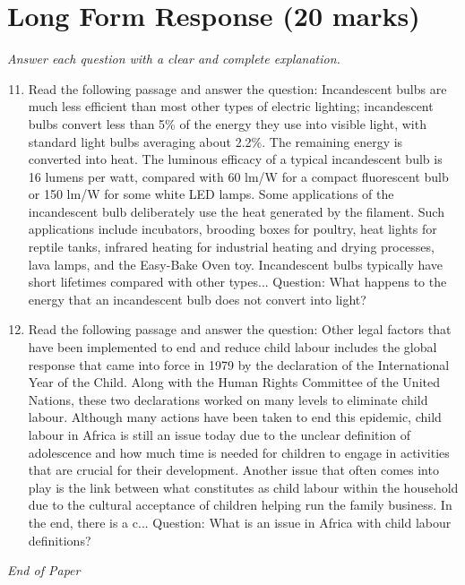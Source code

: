 \documentclass[12pt]{article}
\begin{document}
\section*{Long Form Response (20 marks)}
\textit{Answer each question with a clear and complete explanation.}
\begin{enumerate}[label=\arabic*.]
\setcounter{enumi}{10}
\item Read the following passage and answer the question: Incandescent bulbs are much less efficient than most other types of electric lighting; incandescent bulbs convert less than 5\% of the energy they use into visible light, with standard light bulbs averaging about 2.2\%. The remaining energy is converted into heat. The luminous efficacy of a typical incandescent bulb is 16 lumens per watt, compared with 60 lm/W for a compact fluorescent bulb or 150 lm/W for some white LED lamps. Some applications of the incandescent bulb deliberately use the heat generated by the filament. Such applications include incubators, brooding boxes for poultry, heat lights for reptile tanks, infrared heating for industrial heating and drying processes, lava lamps, and the Easy-Bake Oven toy. Incandescent bulbs typically have short lifetimes compared with other types... Question: What happens to the energy that an incandescent bulb does not convert into light?
\item Read the following passage and answer the question: Other legal factors that have been implemented to end and reduce child labour includes the global response that came into force in 1979 by the declaration of the International Year of the Child. Along with the Human Rights Committee of the United Nations, these two declarations worked on many levels to eliminate child labour. Although many actions have been taken to end this epidemic, child labour in Africa is still an issue today due to the unclear definition of adolescence and how much time is needed for children to engage in activities that are crucial for their development. Another issue that often comes into play is the link between what constitutes as child labour within the household due to the cultural acceptance of children helping run the family business. In the end, there is a c... Question: What is an issue in Africa with child labour definitions?
\end{enumerate}

\vfill
\noindent\textit{End of Paper}
\end{document}
